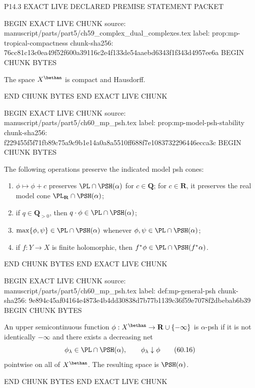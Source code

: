 P14.3 EXACT LIVE DECLARED PREMISE STATEMENT PACKET

BEGIN EXACT LIVE CHUNK
source: manuscript/parts/part5/ch59_complex_dual_complexes.tex
label: prop:mp-tropical-compactness
chunk-sha256: 76cc81c13c0ea49f52f600a39116c2e4f133de54aaebd6343f1f343d4957ee6a
BEGIN CHUNK BYTES
\begin{proposition}\label{prop:mp-tropical-compactness}
The space \(X^{\bethan}\) is compact and Hausdorff.
\end{proposition}
END CHUNK BYTES
END EXACT LIVE CHUNK

BEGIN EXACT LIVE CHUNK
source: manuscript/parts/part5/ch60_mp_psh.tex
label: prop:mp-model-psh-stability
chunk-sha256: f229455f5f71fb89c75a9c9b1e14a0a8a5510ff688f7e1083732296446ecca3c
BEGIN CHUNK BYTES
\begin{proposition}\label{prop:mp-model-psh-stability}
The following operations preserve the indicated model psh cones:
\begin{enumerate}
\item \(\phi\mapsto\phi+c\) preserves
      \(\PL\cap\PSH(\alpha)\) for \(c\in\mathbf Q\); for
      \(c\in\mathbf R\), it preserves the real model cone
      \(\PL_{\mathbf R}\cap\PSH(\alpha)\);
\item if \(q\in\mathbf Q_{>0}\), then
      \(q\cdot\phi\in\PL\cap\PSH(\alpha)\);
\item \(\max\{\phi,\psi\}\in\PL\cap\PSH(\alpha)\) whenever
      \(\phi,\psi\in\PL\cap\PSH(\alpha)\);
\item if \(f:Y\to X\) is finite holomorphic, then
      \(f^*\phi\in\PL\cap\PSH(f^*\alpha)\).
\end{enumerate}
\par
\end{proposition}
END CHUNK BYTES
END EXACT LIVE CHUNK

BEGIN EXACT LIVE CHUNK
source: manuscript/parts/part5/ch60_mp_psh.tex
label: def:mp-general-psh
chunk-sha256: 9e894c45af04164e4873e4b4dd30838d7b77b1139c36f59e7078f2dbebab6b39
BEGIN CHUNK BYTES
\begin{definition}
\label{def:mp-general-psh}
An upper semicontinuous function
\(\phi:X^{\bethan}\to\mathbf R\cup\{-\infty\}\) is
\(\alpha\)-psh if it is not identically \(-\infty\) and there exists a
decreasing net
\[
        \phi_\lambda\in\PL\cap\PSH(\alpha),
        \qquad \phi_\lambda\downarrow\phi
\tag{60.16}\label{eq:mp-psh-decreasing-net}
\]
pointwise on all of \(X^{\bethan}\).  The resulting space is
\(\PSH(\alpha)\).
\end{definition}
END CHUNK BYTES
END EXACT LIVE CHUNK

